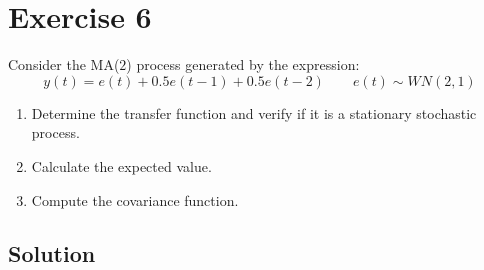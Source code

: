 \section{Exercise 6}

Consider the MA($2$) process generated by the expression:
\[y(t)=e(t)+0.5e(t-1)+0.5e(t-2) \qquad e(t) \sim WN(2,1)\]
\begin{enumerate}
    \item Determine the transfer function and verify if it is a stationary stochastic process.
    \item Calculate the expected value.
    \item Compute the covariance function.
\end{enumerate}

\subsection*{Solution}
